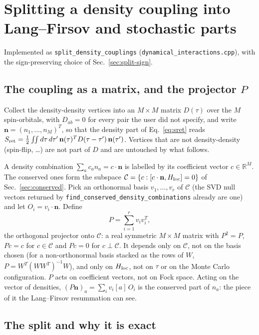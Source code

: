 \documentclass[a4paper,12pt]{article}
\renewcommand{\t}{\ensuremath{\tau}}
\newcommand{\Hloc}{\ensuremath{H_{\rm loc}}}
\begin{document}
\section{Splitting a density coupling into Lang--Firsov and stochastic parts}
\label{sec:split}

Implemented as \texttt{split\_density\_couplings}
(\texttt{dynamical\_interactions.cpp}), with the sign-preserving choice of
Sec.~\ref{sec:split-sign}.

\subsection{The coupling as a matrix, and the projector $P$}

Collect the density-density vertices into an $M\times M$ matrix $D(\t)$ over the $M$
spin-orbitals, with $D_{ab}=0$ for every pair the user did not specify, and write
$\mathbf n=(n_1,\dots,n_M)^T$, so that the density part of Eq.~\eqref{eq:sret} reads
$S_{\rm ret}=\tfrac12\int\!\!\int d\t\,d\t'\,\mathbf n(\t)^T D(\t-\t')\,\mathbf n(\t')$.
Vertices that are not density-density (spin-flip, \ldots) are not part of $D$ and are
untouched by what follows.

A density combination $\sum_a c_a n_a = c\cdot\mathbf n$ is labelled by its coefficient
vector $c\in\mathbb R^M$. The conserved ones form the subspace
$\mathcal C=\{c : [c\cdot\mathbf n,\Hloc]=0\}$ of Sec.~\ref{sec:conserved}. Pick an
orthonormal basis $v_1,\dots,v_r$ of $\mathcal C$ (the SVD null vectors returned by
\texttt{find\_conserved\_density\_combinations} already are one) and let
$O_i=v_i\cdot\mathbf n$. Define
\begin{equation}
  P=\sum_{i=1}^r v_i v_i^T ,
  \label{eq:projector}
\end{equation}
the orthogonal projector onto $\mathcal C$: a real symmetric $M\times M$ matrix with
$P^2=P$, $Pc=c$ for $c\in\mathcal C$ and $Pc=0$ for $c\perp\mathcal C$. It depends only
on $\mathcal C$, not on the basis chosen (for a non-orthonormal basis stacked as the rows
of $W$, $P=W^T(WW^T)^{-1}W$), and only on $\Hloc$, not on $\t$ or on the Monte Carlo
configuration. $P$ acts on coefficient vectors, not on Fock space. Acting on the vector
of densities, $(P\mathbf n)_a=\sum_i v_i[a]\,O_i$ is the conserved part of $n_a$: the
piece of it the Lang--Firsov resummation can see.

\subsection{The split and why it is exact}
\end{document}
